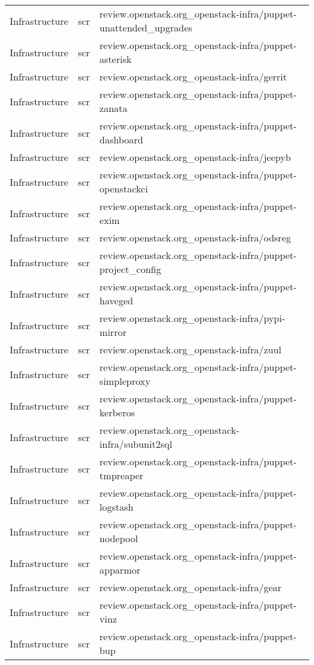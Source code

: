\begin{center}
\begin{longtable}{|p{4cm}|p{1cm}|p{10cm}|}
Infrastructure&scr&review.openstack.org\_openstack-infra/puppet-unattended\_upgrades\\ 
Infrastructure&scr&review.openstack.org\_openstack-infra/puppet-asterisk\\ 
Infrastructure&scr&review.openstack.org\_openstack-infra/gerrit\\ 
Infrastructure&scr&review.openstack.org\_openstack-infra/puppet-zanata\\ 
Infrastructure&scr&review.openstack.org\_openstack-infra/puppet-dashboard\\ 
Infrastructure&scr&review.openstack.org\_openstack-infra/jeepyb\\ 
Infrastructure&scr&review.openstack.org\_openstack-infra/puppet-openstackci\\ 
Infrastructure&scr&review.openstack.org\_openstack-infra/puppet-exim\\ 
Infrastructure&scr&review.openstack.org\_openstack-infra/odsreg\\ 
Infrastructure&scr&review.openstack.org\_openstack-infra/puppet-project\_config\\ 
Infrastructure&scr&review.openstack.org\_openstack-infra/puppet-haveged\\ 
Infrastructure&scr&review.openstack.org\_openstack-infra/pypi-mirror\\ 
Infrastructure&scr&review.openstack.org\_openstack-infra/zuul\\ 
Infrastructure&scr&review.openstack.org\_openstack-infra/puppet-simpleproxy\\ 
Infrastructure&scr&review.openstack.org\_openstack-infra/puppet-kerberos\\ 
Infrastructure&scr&review.openstack.org\_openstack-infra/subunit2sql\\ 
Infrastructure&scr&review.openstack.org\_openstack-infra/puppet-tmpreaper\\ 
Infrastructure&scr&review.openstack.org\_openstack-infra/puppet-logstash\\ 
Infrastructure&scr&review.openstack.org\_openstack-infra/puppet-nodepool\\ 
Infrastructure&scr&review.openstack.org\_openstack-infra/puppet-apparmor\\ 
Infrastructure&scr&review.openstack.org\_openstack-infra/gear\\ 
Infrastructure&scr&review.openstack.org\_openstack-infra/puppet-vinz\\ 
Infrastructure&scr&review.openstack.org\_openstack-infra/puppet-bup\\ 

\end{longtable}
\end{center}
